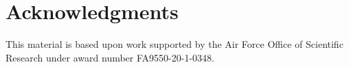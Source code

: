 \documentclass[11pt, one side, article]{memoir}
\theoremstyle{definition}
\theoremstyle{plain}
\newcommand{\0}{\textsf{0}}
\newcommand{\1}{\tn{\textsf{1}}}
\newcommand{\qqand}{\qquad\text{and}\qquad}
\begin{document}
%
%
%


\section*{Acknowledgments}
This material is based upon work supported by the Air Force Office of Scientific Research under award number FA9550-20-1-0348.

\printbibliography 
\end{document}
